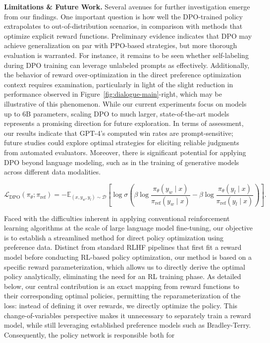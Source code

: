 \textbf{Limitations \& Future Work.} Several avenues for further investigation emerge from our findings. One important question is how well the DPO-trained policy extrapolates to out-of-distribution scenarios, in comparison with methods that optimize explicit reward functions. Preliminary evidence indicates that DPO may achieve generalization on par with PPO-based strategies, but more thorough evaluation is warranted. For instance, it remains to be seen whether self-labeling during DPO training can leverage unlabeled prompts as effectively. Additionally, the behavior of reward over-optimization in the direct preference optimization context requires examination, particularly in light of the slight reduction in performance observed in Figure~\ref{fig:dialogue-main}-right, which may be illustrative of this phenomenon. While our current experiments focus on models up to 6B parameters, scaling DPO to much larger, state-of-the-art models represents a promising direction for future exploration. In terms of assessment, our results indicate that GPT-4's computed win rates are prompt-sensitive; future studies could explore optimal strategies for eliciting reliable judgments from automated evaluators. Moreover, there is significant potential for applying DPO beyond language modeling, such as in the training of generative models across different data modalities.

\begin{equation}\label{eq:optimum_model}
    \mathcal{L}_\text{DPO}(\pi_{\theta}; \pi_\text{ref}) = -\mathbb{E}_{(x, y_w, y_l)\sim \mathcal{D}}\left[\log \sigma \left(\beta \log \frac{\pi_{\theta}(y_w\mid x)}{\pi_\text{ref}(y_w\mid x)} - \beta \log \frac{\pi_{\theta}(y_l\mid x)}{\pi_\text{ref}(y_l\mid x)}\right)\right].
\end{equation}

Faced with the difficulties inherent in applying conventional reinforcement learning algorithms at the scale of large language model fine-tuning, our objective is to establish a streamlined method for direct policy optimization using preference data. Distinct from standard RLHF pipelines that first fit a reward model before conducting RL-based policy optimization, our method is based on a specific reward parameterization, which allows us to directly derive the optimal policy analytically, eliminating the need for an RL training phase. As detailed below, our central contribution is an exact mapping from reward functions to their corresponding optimal policies, permitting the reparameterization of the loss: instead of defining it over rewards, we directly optimize the policy. This change-of-variables perspective makes it unnecessary to separately train a reward model, while still leveraging established preference models such as Bradley-Terry. Consequently, the policy network is responsible both for

